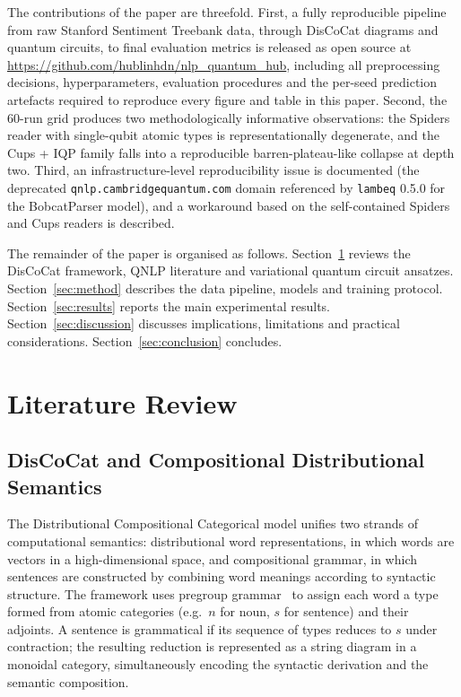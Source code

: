 \documentclass[11pt, a4paper]{article}
\begin{document}
The contributions of the paper are threefold. First, a fully
reproducible pipeline from raw Stanford Sentiment Treebank data,
through DisCoCat diagrams and quantum circuits, to final evaluation
metrics is released as open source at
\url{https://github.com/hublinhdn/nlp_quantum_hub}, including all
preprocessing decisions, hyperparameters, evaluation procedures and
the per-seed prediction artefacts required to reproduce every figure
and table in this paper. Second, the 60-run grid produces
two methodologically informative observations: the Spiders reader with
single-qubit atomic types is representationally degenerate, and the
Cups + IQP family falls into a reproducible barren-plateau-like
collapse at depth two. Third, an infrastructure-level reproducibility issue is
documented (the deprecated \texttt{qnlp.cambridgequantum.com} domain
referenced by \texttt{lambeq} 0.5.0 for the BobcatParser model), and
a workaround based on the self-contained Spiders and Cups readers is
described.

The remainder of the paper is organised as follows.
Section~\ref{sec:related} reviews the DisCoCat framework, QNLP
literature and variational quantum circuit ansatzes.
Section~\ref{sec:method} describes the data pipeline, models and
training protocol. Section~\ref{sec:results} reports the main
experimental results. Section~\ref{sec:discussion} discusses
implications, limitations and practical considerations.
Section~\ref{sec:conclusion} concludes.

\section{Literature Review}
\label{sec:related}

\subsection{DisCoCat and Compositional Distributional Semantics}

The Distributional Compositional Categorical model
\citep{coecke2010} unifies two strands of computational semantics:
distributional word representations, in which words are vectors in a
high-dimensional space, and compositional grammar, in which sentences
are constructed by combining word meanings according to syntactic
structure. The framework uses pregroup grammar~\citep{lambek1958} to
assign each word a type formed from atomic categories (e.g.\ \(n\) for
noun, \(s\) for sentence) and their adjoints. A sentence is
grammatical if its sequence of types reduces to \(s\) under
contraction; the resulting reduction is represented as a string diagram
in a monoidal category, simultaneously encoding the syntactic
derivation and the semantic composition.
\end{document}
